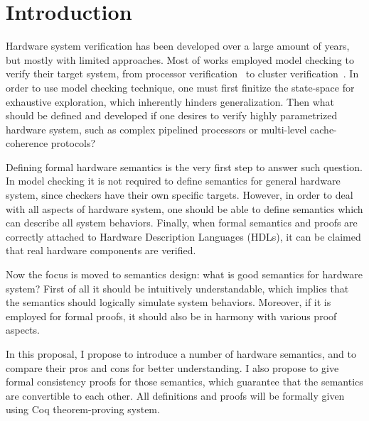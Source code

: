 \section{Introduction}

Hardware system verification has been developed over a large amount of
years, but mostly with limited approaches. Most of works employed
model checking to verify their target system, from processor
verification~\cite{ProcVerif1, ProcVerif2} to cluster
verification~\cite{ClusterVerif}. In order to use model checking
technique, one must first finitize the state-space for exhaustive
exploration, which inherently hinders generalization. Then what should
be defined and developed if one desires to verify highly parametrized
hardware system, such as complex pipelined processors or multi-level
cache-coherence protocols?

Defining formal hardware semantics is the very first step to answer
such question. In model checking it is not required to define
semantics for general hardware system, since checkers have their own
specific targets. However, in order to deal with all aspects of
hardware system, one should be able to define semantics which can
describe all system behaviors. Finally, when formal semantics and
proofs are correctly attached to Hardware Description Languages
(HDLs), it can be claimed that real hardware components are verified.

Now the focus is moved to semantics design: what is good semantics for
hardware system? First of all it should be intuitively understandable,
which implies that the semantics should logically simulate system
behaviors. Moreover, if it is employed for formal proofs, it should
also be in harmony with various proof aspects.

In this proposal, I propose to introduce a number of hardware
semantics, and to compare their pros and cons for better
understanding. I also propose to give formal consistency proofs for
those semantics, which guarantee that the semantics are convertible to
each other. All definitions and proofs will be formally given using
Coq theorem-proving system.

